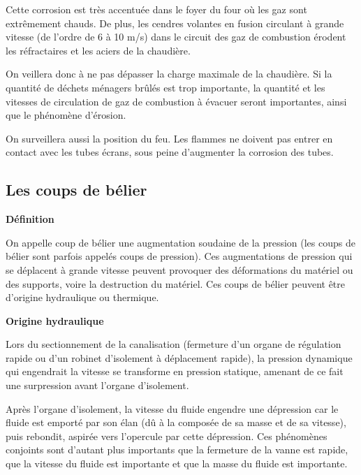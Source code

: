 Cette corrosion est très accentuée dans le foyer du four où les gaz sont extrêmement chauds. De plus, les cendres volantes en fusion circulant à grande vitesse (de l’ordre de 6 à 10 m/s) dans le circuit des gaz de combustion érodent les réfractaires et les aciers de la chaudière.
\vspace{0.3cm}

On veillera donc à ne pas dépasser la charge maximale de la chaudière. Si la quantité de déchets ménagers brûlés est trop importante, la quantité et les vitesses de circulation de gaz de combustion à évacuer seront importantes, ainsi que le phénomène d’érosion.
\vspace{0.3cm}

On surveillera aussi la position du feu. Les flammes ne doivent pas entrer en contact avec les tubes écrans, sous peine d’augmenter la corrosion des tubes.


\subsection{Les coups de bélier}


\vspace{0.3cm}
\textbf{Définition}
\vspace{0.3cm}

On appelle coup de bélier une augmentation soudaine de la pression (les coups de bélier sont parfois appelés coups de pression). Ces augmentations de pression qui se déplacent à grande vitesse peuvent provoquer des déformations du matériel ou des supports, voire la destruction du matériel. Ces coups de bélier peuvent être d’origine hydraulique ou thermique.

\vspace{0.3cm}
\textbf{Origine hydraulique}
\vspace{0.3cm}

Lors du sectionnement de la canalisation (fermeture d’un organe de régulation rapide ou d’un robinet d’isolement à déplacement rapide), la pression dynamique qui engendrait la vitesse se transforme en pression statique, amenant de ce fait une surpression avant l’organe d’isolement.
\vspace{0.3cm}

Après l’organe d’isolement, la vitesse du fluide engendre une dépression car le fluide est emporté par son élan (dû à la composée de sa masse et de sa vitesse), puis rebondit, aspirée vers l’opercule par cette dépression.
Ces phénomènes conjoints sont d’autant plus importants que la fermeture de la vanne est rapide, que la vitesse du fluide est importante et que la masse du fluide est importante.
\vspace{0.3cm}

